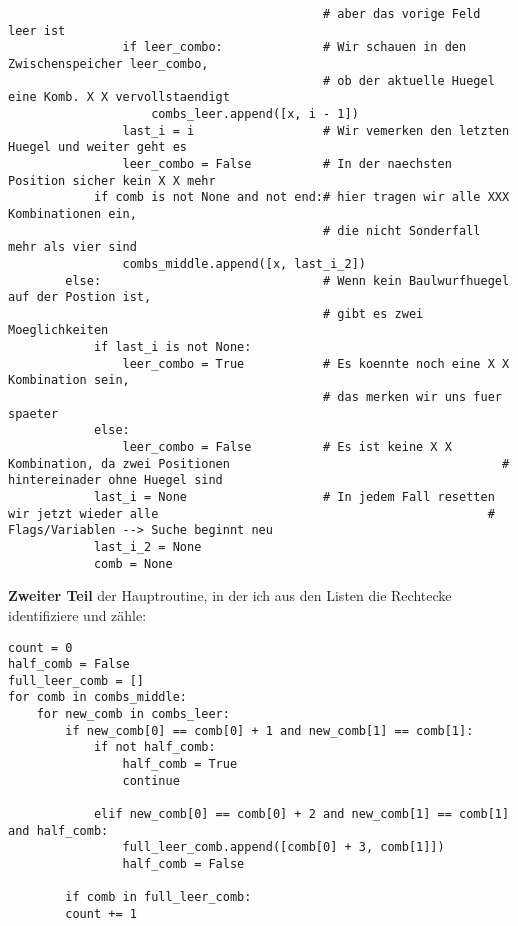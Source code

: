 \documentclass[a4paper,10pt,ngerman]{scrartcl}
\begin{document}
\begin{lstlisting}
                                            # aber das vorige Feld leer ist
                if leer_combo:              # Wir schauen in den Zwischenspeicher leer_combo, 
                                            # ob der aktuelle Huegel eine Komb. X X vervollstaendigt
                    combs_leer.append([x, i - 1])
                last_i = i                  # Wir vemerken den letzten Huegel und weiter geht es
                leer_combo = False          # In der naechsten Position sicher kein X X mehr
            if comb is not None and not end:# hier tragen wir alle XXX Kombinationen ein, 
                                            # die nicht Sonderfall mehr als vier sind
                combs_middle.append([x, last_i_2])
        else:                               # Wenn kein Baulwurfhuegel auf der Postion ist, 
                                            # gibt es zwei Moeglichkeiten
            if last_i is not None:
                leer_combo = True           # Es koennte noch eine X X Kombination sein, 
                                            # das merken wir uns fuer spaeter
            else:
                leer_combo = False          # Es ist keine X X Kombination, da zwei Positionen                                      # hintereinader ohne Huegel sind
            last_i = None                   # In jedem Fall resetten wir jetzt wieder alle                                              # Flags/Variablen --> Suche beginnt neu
            last_i_2 = None
            comb = None
\end{lstlisting}
\textbf{Zweiter Teil} der Hauptroutine, in der ich aus den Listen die Rechtecke identifiziere und zähle:
\begin{lstlisting}
count = 0
half_comb = False
full_leer_comb = []
for comb in combs_middle:
    for new_comb in combs_leer:
        if new_comb[0] == comb[0] + 1 and new_comb[1] == comb[1]:
            if not half_comb:
                half_comb = True
                continue
            
            elif new_comb[0] == comb[0] + 2 and new_comb[1] == comb[1] and half_comb:
                full_leer_comb.append([comb[0] + 3, comb[1]])
                half_comb = False
        
        if comb in full_leer_comb:
        count += 1
\end{lstlisting}
\end{document}
